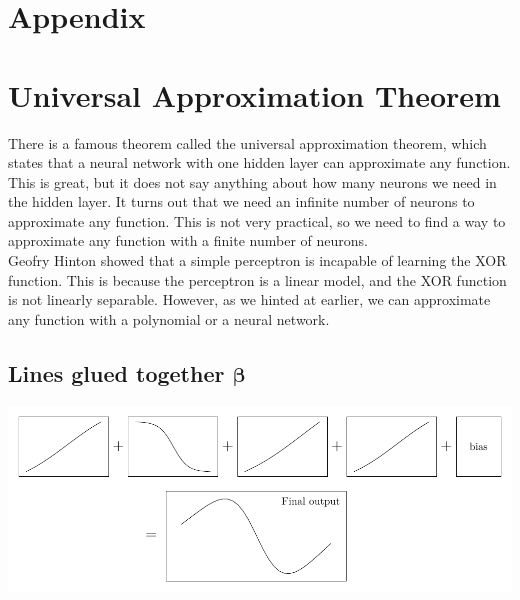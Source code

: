\documentclass[twoside,11pt]{report}
\begin{document}

%
%
\newpage
\appendix
{}%
\section*{Appendix}
\label{app:appendix}


\section{ Universal Approximation Theorem }
\label{sec:UAT}

There is a famous theorem called the universal approximation theorem, which states that a neural network with one hidden
layer can approximate any function. This is great, but it does not say anything about how many neurons we need in the
hidden layer. It turns out that we need an infinite number of neurons to approximate any function. This is not very
practical, so we need to find a way to approximate any function with a finite number of neurons.\\

Geofry Hinton showed that a simple perceptron is incapable of learning the XOR function. 
This is because the perceptron is a linear model, and the XOR function is not linearly separable. 
However, as we hinted at earlier, we can approximate any function with a polynomial or a neural network.



%
\subsection*{Lines glued together $\boldsymbol{\beta}$}
\label{app:OptimalBeta}



\includegraphics[width=\textwidth]{tikzfigures/universal.pdf}

%
\end{document}
